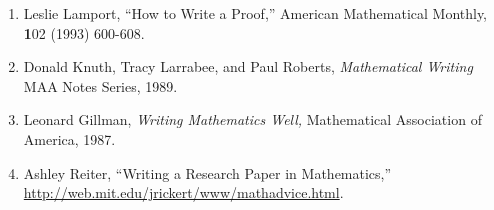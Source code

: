 \documentclass[12pt]{article}
\newenvironment{numlist}{
  \begin{enumerate}[(1)]
    \addtolength{\itemsep}{-1.0\itemsep}}
  {\end{enumerate}}
\newcounter{ex}\setcounter{ex}{0}
\newcounter{se}\setcounter{se}{0}
\begin{document}
\begin{numlist}

\item Leslie Lamport, ``How to Write a Proof,'' American Mathematical Monthly, { \textbf 102} 
(1993) 600-608.  

\item Donald Knuth, Tracy Larrabee, and Paul Roberts,  \emph{Mathematical   Writing} MAA Notes Series, 1989.

\item Leonard Gillman, {\em Writing Mathematics Well,\/} Mathematical
Association of America, 1987.

\item Ashley Reiter, ``Writing a Research Paper in Mathematics,''  \url{http://web.mit.edu/jrickert/www/mathadvice.html}.


\end{numlist}
\end{document}
